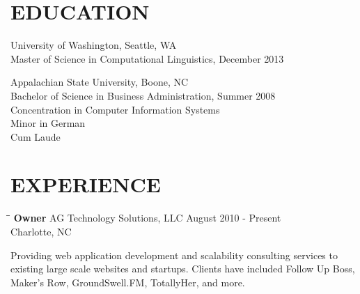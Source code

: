 \documentclass{res}
\begin{document}
\address{\large\bf  Anthony Gentile}
\address{6932 Loretta Place \\  Charlotte, NC 28215 \\  (704) 657-8550 \\ asgentile@gmail.com}

\begin{resume}

\section{EDUCATION}
    University of Washington, Seattle, WA  \\
    Master of Science in Computational Linguistics, December 2013

    Appalachian State University, Boone, NC  \\
    Bachelor of Science in Business Administration, Summer 2008   \\
    Concentration in Computer Information Systems       \\
    Minor in German  \\
    Cum Laude

\section{EXPERIENCE}
   \vspace{-0.1in}
   \begin{tabbing}
   \hspace{2.3in}\= \hspace{2.6in}\= \kill %
    {\bf Owner} \>AG Technology Solutions, LLC     \> August 2010 - Present\\
                             \>Charlotte, NC
   \end{tabbing}\vspace{-5pt}      %
    Providing web application development and scalability consulting services to existing large scale websites and startups. Clients have included Follow Up Boss, Maker's Row, GroundSwell.FM, TotallyHer, and more.


\end{resume}
\end{document}
